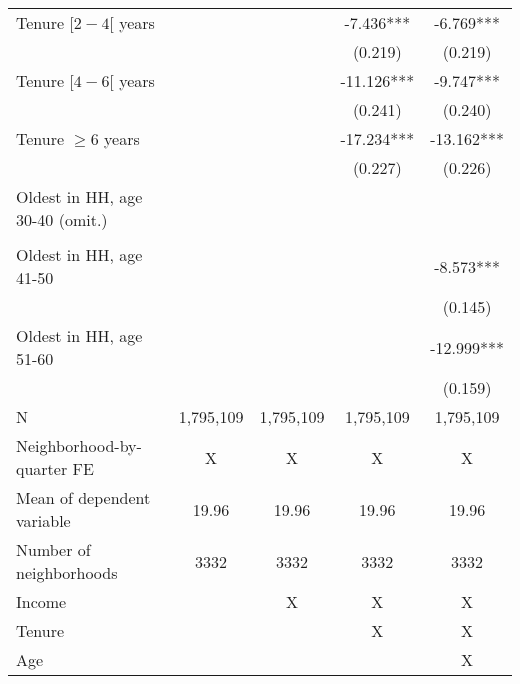 \begin{tabular}{lcccc}
Tenure $[2-4[$ years &  &  & -7.436*** & -6.769*** \\ 
 &  &  & (0.219) & (0.219) \\ 
Tenure $[4-6[$ years &  &  & -11.126*** & -9.747*** \\ 
 &  &  & (0.241) & (0.240) \\ 
Tenure $\geq 6$ years &  &  & -17.234*** & -13.162*** \\ 
 &  &  & (0.227) & (0.226) \\ 
Oldest in HH, age 30-40 (omit.) &  &  &  &  \\ 
 &  &  &  &  \\ 
Oldest in HH, age 41-50 &  &  &  & -8.573*** \\ 
 &  &  &  & (0.145) \\ 
Oldest in HH, age 51-60 &  &  &  & -12.999*** \\ 
 &  &  &  & (0.159) \\ 
 \midrule
N & 1,795,109 & 1,795,109 & 1,795,109 & 1,795,109 \\ 
Neighborhood-by-quarter FE & X & X & X & X \\ 
Mean of dependent variable & 19.96 & 19.96 & 19.96 & 19.96 \\ 
Number of neighborhoods & 3332 & 3332 & 3332 & 3332 \\ 
Income &  & X & X & X \\ 
Tenure &  &  & X & X \\ 
Age &  &  &  & X \\ 
\bottomrule
\end{tabular}
